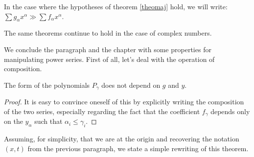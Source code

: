 In the case where the hypotheses of theorem \ref{theomaj} hold, we will write:  $\sum g_\alpha x^\alpha \gg \sum f_\alpha x^\alpha$.

\begin{remark}
The same theorems continue to hold in the case of complex numbers.
\end{remark}

We conclude the paragraph and the chapter with some properties for manipulating power series. 
First of all, let’s deal with the operation of composition.
\begin{theorem}
\end{theorem}
\begin{remark}
The form of the polynomials $P_\gamma$ does not depend on $g$ and $y$.
\end{remark}
\begin{proof}
It is easy to convince oneself of this by explicitly writing the composition of the two series, especially regarding the fact that the coefficient $f_\gamma$ depends only on the $y_\alpha$ such that $\alpha_i \leq \gamma_i$.
\end{proof}

Assuming, for simplicity, that we are at the origin and recovering the notation $(x,t)$ from the previous paragraph, we state a simple rewriting of this theorem.
\begin{theorem}[Composition]\label{composition}
\end{theorem}

